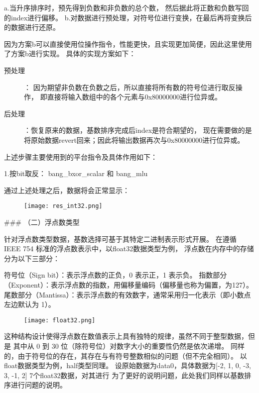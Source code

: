 a.当升序排序时，预先得到负数和非负数的总个数，
然后据此将正数和负数写回的index进行偏移。
b.对数据进行预处理，对符号位进行变换，在最后再将变换后的数据进行还原。

因为方案b可以直接使用位操作指令，性能更快，且实现更加简便，因此这里使用了方案b进行实现。
具体的实现方案如下：
\begin{description}
\item[预处理]：
因为期望非负数在负数之后，所以直接将所有数的符号位进行取反操作，
即直接将输入数组中的各个元素与0x80000000进行位异或。

\item[后处理]：恢复原来的数据，基数排序完成后index是符合期望的，
现在需要做的是将原始数据revert回来；因此将输出数据再次与0x80000000进行位异或。
\end{description}

上述步骤主要使用到的平台指令及具体作用如下：

1.按bit取反： bang\_bxor\_scalar 和 bang\_mlu

通过上述处理之后，数据将会正常显示：

\begin{figure}[ht]
    \centering
    \texttt{[image: res\_int32.png]}
    \caption{}
    \label{fig:res_int32}
\end{figure}





### （二）浮点数类型

针对浮点数类型数据，基数选择可基于其特定二进制表示形式开展。
在遵循 IEEE 754 标准的浮点数表示中，以float32数据类型为例，
浮点数在内存中的存储分为以下三部分：

符号位（Sign bit）：表示浮点数的正负，0 表示正，1 表示负。
指数部分（Exponent）：表示浮点数的指数，用偏移量编码（偏移量也称为偏置，为127）。
尾数部分（Mantissa）：表示浮点数的有效数字，通常采用归一化表示（即小数点左边默认为 1）。


\begin{figure}[ht]
    \centering
    \texttt{[image: float32.png]}
    \caption{}
    \label{fig:float32}
\end{figure}
这种结构设计使得浮点数在数值表示上具有独特的规律，虽然不同于整型数据，但是
其中从 0 到 30 位（除符号位）对数字大小的重要性仍然是依次递增。
同样的，由于符号位的存在，其存在与有符号整数相似的问题（但不完全相同）。
以float数据类型为例，half类型同理。
设原始数据为data0，具体数据为[-2, 1, 0,  -3, 3, -1, 2] 7个float32数据，对其进行
为了更好的说明问题，此处我们同样以基数排序进行问题的说明。




